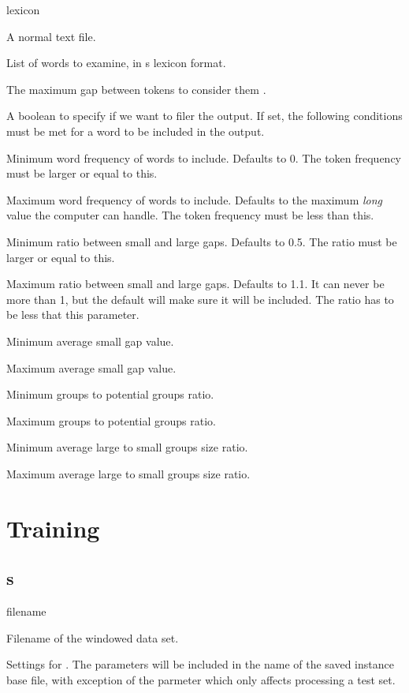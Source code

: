 \documentclass[a4paper,10pt,twoside]{report}
\begin{document}
\begin{varlist}{lexicon}
\item[filename] A normal text file.
\item[lexicon] List of words to examine, in \wopr{}s lexicon format.
\item[gap] The maximum gap between tokens to consider them
  .
\item[filter] A boolean to specify if we want to filer the 
  output. If set, the following conditions must be met for a word
  to be included in the output.
\item[min\_f] Minimum word frequency of words to include. Defaults to
  0. The token frequency must be larger or equal to this.
\item[max\_f] Maximum word frequency of words to include. Defaults to
  the maximum \emph{long} value the computer can handle. The token
  frequency must be less than this.
\item[min\_r] Minimum ratio between small and large gaps. Defaults to
  0.5. The ratio must be larger or equal to this.
\item[max\_r] Maximum ratio between small and large gaps. Defaults to
  1.1. It can never be more than 1, but the default will make sure it
  will be included. The ratio has to be less that this parameter.
\item[min\_a] Minimum average small gap value.
\item[max\_a] Maximum average small gap value.
\item[min\_p] Minimum groups to potential groups ratio.
\item[max\_p] Maximum groups to potential groups ratio.
\item[min\_g] Minimum average large to small groups size ratio.
\item[max\_g] Maximum average large to small groups size ratio. 
\end{varlist}


\section{Training}

\subsection{s}

\begin{varlist}{filename}
\item[filename] Filename of the windowed data set.
\item[timbl] Settings for \Timbl{}. The parameters will be included in
  the name of the saved instance base file, with exception of the
   parmeter which only affects processing a test set.
\end{varlist}
\end{document}
